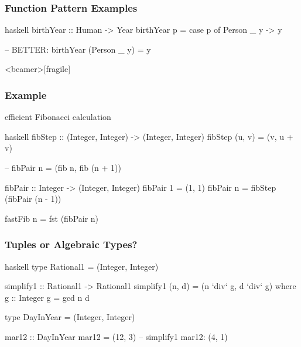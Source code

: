 \documentclass[dvipsnames]{beamer}
\theoremstyle{plain}
\begin{document}
\begin{frame}[fragile]
  \frametitle{Function Pattern Examples}

  \begin{exampleblock}{}
    \begin{pygments}{haskell}
birthYear :: Human -> Year
birthYear p =
    case p of
      Person _ y -> y

-- BETTER:
birthYear (Person _ y) = y
    \end{pygments}
  \end{exampleblock}
\end{frame}

\begin{frame}<beamer>[fragile]
  \frametitle{Example}

  \begin{exampleblock}{efficient Fibonacci calculation}
    \begin{pygments}{haskell}
fibStep :: (Integer, Integer) -> (Integer, Integer)
fibStep (u, v) = (v, u + v)

-- fibPair n = (fib n, fib (n + 1))

fibPair :: Integer -> (Integer, Integer)
fibPair 1 = (1, 1)
fibPair n = fibStep (fibPair (n - 1))

fastFib n = fst (fibPair n)
    \end{pygments}
  \end{exampleblock}
\end{frame}

\begin{frame}[fragile]
  \frametitle{Tuples or Algebraic Types?}

  \begin{exampleblock}{}
    \begin{pygments}{haskell}
type Rational1 = (Integer, Integer)

simplify1 :: Rational1 -> Rational1
simplify1 (n, d) = (n `div` g, d `div` g)
  where
    g :: Integer
    g = gcd n d

type DayInYear = (Integer, Integer)

mar12 :: DayInYear
mar12 = (12, 3)
-- simplify1 mar12: (4, 1)
    \end{pygments}
  \end{exampleblock}
\end{frame}
\end{document}
